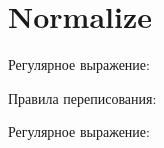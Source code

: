 \section{Normalize}
\begin{frame}{}
	Регулярное выражение:


	Правила переписования:


	Регулярное выражение:

\end{frame}
